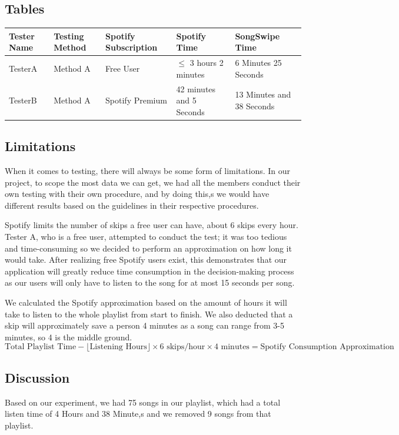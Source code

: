 \documentclass{article}
\begin{document}
\subsection*{Tables}
\begin{longtable}{lllll}
Tester Name & Testing Method & Spotify Subscription & Spotify Time & SongSwipe Time \\
\hline
TesterA & Method A & Free User & $\leq$ 3 hours 2 minutes & 6 Minutes 25 Seconds \\
TesterB & Method A & Spotify Premium & 42 minutes and 5 Seconds & 13 Minutes and 38 Seconds \\
\end{longtable}

\subsection{Limitations}
When it comes to testing, there will always be some form of limitations. In our project, to scope the most data we can get, we had all the members conduct their own testing with their own procedure, and by doing this,s we would have different results based on the guidelines in their respective procedures.

Spotify limits the number of skips a free user can have, about 6 skips every hour. Tester A, who is a free user, attempted to conduct the test; it was too tedious and time-consuming so we decided to perform an approximation on how long it would take. After realizing free Spotify users exist, this demonstrates that our application will greatly reduce time consumption in the decision-making process as our users will only have to listen to the song for at most 15 seconds per song.
    
\begin{center}
    We calculated the Spotify approximation based on the amount of hours it will take to listen to the whole playlist from start to finish. We also deducted that a skip will approximately save a person 4 minutes as a song can range from 3-5 minutes, so 4 is the middle ground. \newline 
\begin{equation}
\text{Total Playlist Time} - \lfloor\text{Listening Hours}\rfloor \times 6\text{ skips/hour} \times 4\text{ minutes} = \text{Spotify Consumption Approximation}
\end{equation}
\end{center}

\subsection{Discussion}
Based on our experiment, we had 75 songs in our playlist, which had a total listen time of 4 Hours and 38 Minute,s and we removed 9 songs from that playlist. \\
    
\end{document}
